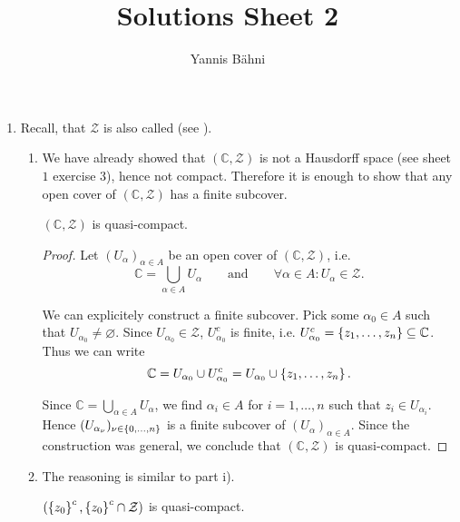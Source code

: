 

\title{Solutions Sheet 2}
\author{Yannis B\"{a}hni}
\address[Yannis B\"{a}hni]{University of Zurich, R\"{a}mistrasse 71, 8006 Zurich}


\maketitle
\thispagestyle{fancy}
\begin{enumerate}[label = \textbf{Exercise \arabic*.},wide = 0pt, itemsep=1.5ex]
	\item Recall, that $\mathcal{Z}$ is also called  (see \cite[45]{lee:topological_manifolds:2011}). 
		\begin{enumerate}[label = (\roman*),wide = 10pt, itemsep=1.5ex]
			\item We have already showed that $(\mathbb{C},\mathcal{Z})$ is not a Hausdorff space (see sheet $1$ exercise $3$), hence not compact. Therefore it is enough to show that any open cover of $(\mathbb{C},\mathcal{Z})$ has a finite subcover. 
					\begin{lemma}
						$(\mathbb{C},\mathcal{Z})$ is quasi-compact.
						\label{lem:finitecover}
					\end{lemma}
				
				\begin{proof}
				Let $(U_\alpha)_{\alpha \in A}$ be an open cover of $(\mathbb{C},\mathcal{Z})$, i.e. 
				\begin{equation}
					\mathbb{C} = \bigcup_{\alpha \in A}U_\alpha \qquad \text{and} \qquad \forall \alpha \in A: U_\alpha \in \mathcal{Z}.
				\end{equation}

				We can explicitely construct a finite subcover. Pick some $\alpha_0 \in A$ such that $U_{\alpha_0} \neq \varnothing$. Since $U_{\alpha_0} \in \mathcal{Z}$, $U_{\alpha_0}^c$ is finite, i.e. $U_{\alpha_0}^c = \cbr[0]{z_1,\dots,z_n} \subseteq \mathbb{C}$. Thus we can write 
		\begin{equation}
			\mathbb{C} = U_{\alpha_0} \cup U_{\alpha_0}^c = U_{\alpha_0} \cup \cbr[0]{z_1,\dots,z_n}.
		\end{equation}

		Since $\mathbb{C} = \bigcup_{\alpha \in A}U_\alpha$, we find $\alpha_i \in A$ for $i = 1,\dots,n$ such that $z_i \in U_{\alpha_i}$. Hence $(U_{\alpha_\nu})_{\nu \in \cbr[0]{0,\dots,n}}$ is a finite subcover of $(U_\alpha)_{\alpha \in A}$. Since the construction was general, we conclude that $(\mathbb{C},\mathcal{Z})$ is quasi-compact. 
	\end{proof}
\item The reasoning is similar to part i).
		\begin{lemma}
			$(\cbr[0]{z_0}^c, \cbr[0]{z_0}^c \cap \mathcal{Z})$ is quasi-compact.
			\label{lem:z_0_quasi}
		\end{lemma}


\end{enumerate}
\end{enumerate}
